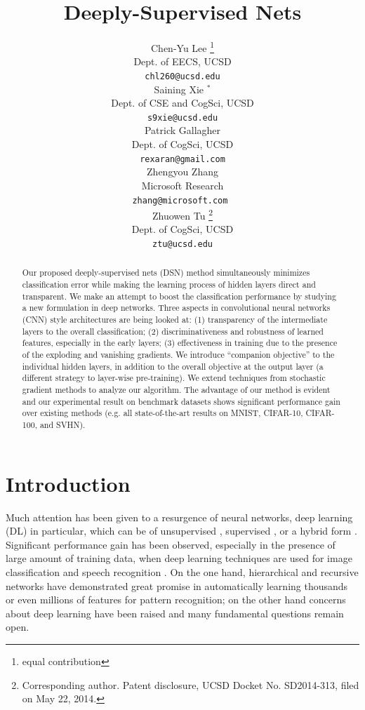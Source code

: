 \documentclass{article} %
\title{Deeply-Supervised Nets}
\author{
Chen-Yu Lee \thanks{equal contribution} \\
Dept. of EECS, UCSD\\
\texttt{chl260@ucsd.edu} \\
\And
Saining Xie $^{*}$ \\
Dept. of CSE and CogSci, UCSD\\
\texttt{s9xie@ucsd.edu} \\
\AND
Patrick Gallagher \\
Dept. of CogSci, UCSD\\
\texttt{rexaran@gmail.com} \\
\And
Zhengyou Zhang \\
Microsoft Research \\
\texttt{zhang@microsoft.com } \\
\And
Zhuowen Tu \thanks{Corresponding author. Patent disclosure, UCSD Docket No. SD2014-313, filed on May 22, 2014.} \\
Dept. of CogSci, UCSD\\
\texttt{ztu@ucsd.edu} \\
}
\begin{document}
\maketitle


\begin{abstract}
\vspace{-5mm}
Our proposed deeply-supervised nets (DSN) method simultaneously minimizes classification error while making the learning process of hidden layers direct and transparent. We make an attempt to boost the classification performance by studying a new formulation in deep networks. Three aspects in convolutional neural networks (CNN) style architectures are being looked at: (1) transparency of the intermediate layers to the overall classification; (2) discriminativeness and robustness of learned features, especially in the early layers; (3) effectiveness in training due to the presence of the exploding and vanishing gradients.  We introduce ``companion objective'' to the individual hidden layers, in addition to the overall objective at the output layer (a different strategy to layer-wise pre-training). We extend techniques from stochastic gradient methods to analyze our algorithm. The advantage of our method is evident and our experimental result on benchmark datasets shows significant performance gain over existing methods (e.g. all state-of-the-art results on MNIST, CIFAR-10, CIFAR-100, and SVHN).
\end{abstract}

\section{Introduction}
Much attention has been given to a resurgence of neural networks, deep learning (DL) in particular, which can be of unsupervised \cite{Hinton06}, supervised \cite{CNN}, or a hybrid form \cite{Lee09}. Significant performance gain has been observed, especially in the presence of large amount of training data, when deep learning techniques are used for image classification \cite{dropout,Le10} and speech recognition \cite{Dahl12}. On the one hand, hierarchical and recursive networks \cite{Elman91,Hinton06,CNN} have demonstrated great promise in automatically learning thousands or even millions of features for pattern recognition; on the other hand concerns about deep learning have been raised and many fundamental questions remain open.
\end{document}
